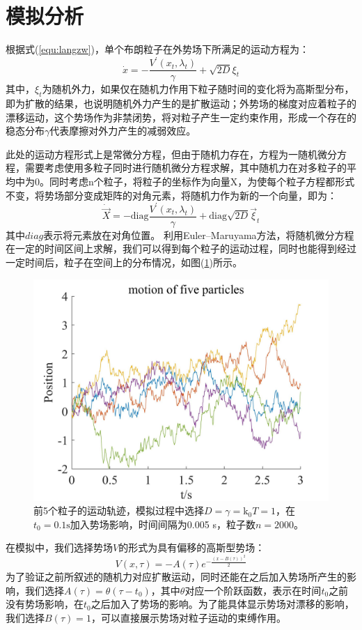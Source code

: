 \section{模拟分析}
根据式(\ref{equ:langzw})，单个布朗粒子在外势场下所满足的运动方程为：
$$
\dot{x}=-\frac{V^\prime\left( x_t,\lambda _t \right)}{\gamma}+\sqrt{2D}\xi _t
$$
其中，$\xi_t$为随机外力，如果仅在随机力作用下粒子随时间的变化将为高斯型分布，即为扩散的结果，也说明随机外力产生的是扩散运动；外势场的梯度对应着粒子的漂移运动，这个势场作为非禁闭势，将对粒子产生一定约束作用，形成一个存在的稳态分布$\gamma$代表摩擦对外力产生的减弱效应。

此处的运动方程形式上是常微分方程，但由于随机力存在，方程为一随机微分方程，需要考虑使用多粒子同时进行随机微分方程求解，其中随机力在对多粒子的平均中为0。同时考虑n个粒子，将粒子的坐标作为向量X，为使每个粒子方程都形式不变，将势场部分变成矩阵的对角元素，将随机力作为新的一个向量，即为：
$$
\dot{\vec{X}}=-\mathrm{diag}\frac{V^\prime\left( x_t,\lambda _t \right)}{\gamma}+\mathrm{diag}\sqrt{2D}\vec{\xi}_t
$$
其中$diag$表示将元素放在对角位置。
利用Euler–Maruyama方法\cite{vomscheidtKloedenPEPlaten1994}，将随机微分方程在一定的时间区间上求解，我们可以得到每个粒子的运动过程，同时也能得到经过一定时间后，粒子在空间上的分布情况，如图(\ref{fig:sim-coordinate})所示。

\begin{figure}[htbp]
    \centering
    \includegraphics[width=0.8\linewidth]{figs/粒子坐标.jpg}
    \caption{前5个粒子的运动轨迹，模拟过程中选择$D=\gamma=\mathrm{k}_{0}T=1$，在$t_0=0.1 \text{s}$加入势场影响，时间间隔为0.005 s，粒子数$n=2000$。}
    \label{fig:sim-coordinate}
\end{figure}

在模拟中，我们选择势场$V$的形式为具有偏移的高斯型势场：
\begin{equation}
    V\left( x,\tau \right) =-A\left( \tau \right) e^{-\frac{\left( x-B\left( \tau \right) \right) ^2}{2}}
\end{equation}
为了验证之前所叙述的随机力对应扩散运动，同时还能在之后加入势场所产生的影响，我们选择$A(\tau)=\theta(\tau-t_0)$，其中$\theta$对应一个阶跃函数，表示在时间$t_0$之前没有势场影响，在$t_0$之后加入了势场的影响。为了能具体显示势场对漂移的影响，我们选择$B(\tau)=1$，可以直接展示势场对粒子运动的束缚作用。

